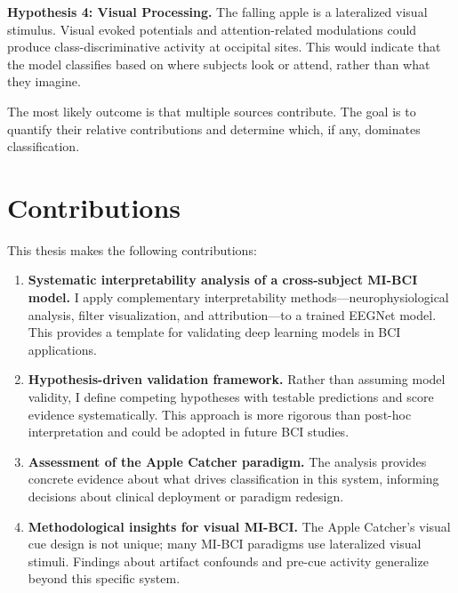 \textbf{Hypothesis 4: Visual Processing.} The falling apple is a lateralized visual stimulus. Visual evoked potentials and attention-related modulations could produce class-discriminative activity at occipital sites. This would indicate that the model classifies based on where subjects look or attend, rather than what they imagine.

The most likely outcome is that multiple sources contribute. The goal is to quantify their relative contributions and determine which, if any, dominates classification.


\section{Contributions}
\label{sec:intro_contributions}

This thesis makes the following contributions:

\begin{enumerate}
    \item \textbf{Systematic interpretability analysis of a cross-subject MI-BCI model.} I apply complementary interpretability methods—neurophysiological analysis, filter visualization, and attribution—to a trained EEGNet model. This provides a template for validating deep learning models in BCI applications.
    
    \item \textbf{Hypothesis-driven validation framework.} Rather than assuming model validity, I define competing hypotheses with testable predictions and score evidence systematically. This approach is more rigorous than post-hoc interpretation and could be adopted in future BCI studies.
    
    \item \textbf{Assessment of the Apple Catcher paradigm.} The analysis provides concrete evidence about what drives classification in this system, informing decisions about clinical deployment or paradigm redesign.
    
    \item \textbf{Methodological insights for visual MI-BCI.} The Apple Catcher's visual cue design is not unique; many MI-BCI paradigms use lateralized visual stimuli. Findings about artifact confounds and pre-cue activity generalize beyond this specific system.
\end{enumerate}


